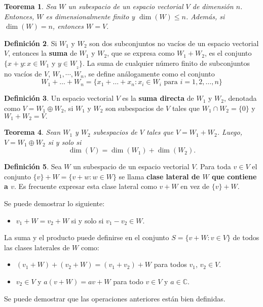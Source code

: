 \documentclass[12pt]{book}
\newtheorem{theorem}{Teorema}[section]
\theoremstyle{definition}
\newtheorem{definition}[theorem]{Definición}
\newcounter{in}
\newcounter{ini}
\begin{document}
\begin{theorem}
  \label{esp-iguales}
  Sea $W$ un subespacio de un espacio vectorial $V$ de dimensión
  $n$. Entonces, $W$ es dimensionalmente finito y $\dim(W)\leq
  n$. Además, si $\dim(W)=n$, entonces $W=V$.
\end{theorem}

\begin{definition}
  Si $W_{1}$ y $W_{2}$ son dos subconjuntos no vacíos de un espacio
  vectorial $V$, entonces la \textbf{suma} de $W_{1}$ y $W_{2}$, que se
  expresa como $W_{1}+W_{2}$, es el conjunto $\{x+y:x\in W_{1}$ y $y\in
  W_{_2}\}$. La suma de cualquier número finito de subconjuntos no
  vacíos de $V$, $W_{1},\cdots,W_{n}$, se define análogamente como el
  conjunto
  $$W_{1}+\ldots+W_{n}=\{x_{1}+\ldots+x_{n}: x_{i}\in W_{i} \mbox{ para }i=1,2,\ldots,n\}$$
\end{definition}

\begin{definition}
  \label{suma-directa}
  Un espacio vectorial $V$ es la \textbf{suma directa} de $W_{1}$ y
  $W_{2}$, denotada como $V=W_{1}\oplus W_{2}$, si $W_{1}$ y $W_{2}$
  son subespacios de $V$ tales que $W_{1}\cap W_{2}=\{0\}$ y
  $W_{1}+W_{2}=V.$ 
\end{definition}

\begin{theorem}
  Sean $W_{1}$ y $W_{2}$ subespacios de $V$ tales que
  $V=W_{1}+W_{2}$. Luego, $V=W_{1}\oplus W_{2}$ si y solo si 
  $$\dim(V)=\dim(W_{1})+\dim(W_{2}).$$
\end{theorem}

\begin{definition}
  Sea $W$ un subespacio de un espacio vectorial $V$. Para toda $v\in V$ el conjunto $\{v\}+W=\{v+w:w\in W\}$ se
  llama \textbf{clase lateral de $W$ que contiene a $v$}. Es frecuente
  expresar esta clase lateral como $v+W$ en vez de $\{v\}+W$. 
\end{definition}

Se puede demostrar lo siguiente:
\begin{itemize}
\item $v_{1}+W=v_{2}+W$ si y solo si $v_{1}-v_{2}\in W.$
\end{itemize}
La suma y el producto puede definirse en el conjunto $S=\{v+W:v\in
V\}$ de todos las clases laterales de $W$ como: 
\begin{itemize}
\item $(v_{1}+W)+(v_{2}+W)=(v_{1}+v_{2})+W$ para todos $v_{1}$, $v_{2}\in V$.
\item $v_{2}\in V$ y $a(v+W)=av+W$ para todo $v\in V$ y $a\in \mathbb{C}$.
\end{itemize}
Se puede demostrar que las operaciones anteriores están bien definidas.
\end{document}
